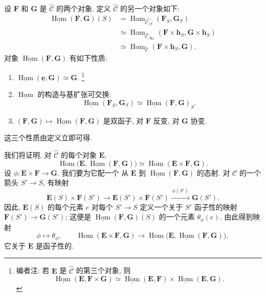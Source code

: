 设 \(\mathbf F\) 和 \(\mathbf G\) 是 \(\widehat{\mathscr C}\)
的两个对象. 定义 \(\widehat{\mathscr C}\) 的另一个对象如下:
\begin{align*}
  \underline{\operatorname{Hom}}(\mathbf F,\mathbf G)(S)
  &={}\operatorname{Hom}_{\widehat{\mathscr C_{/S}}}
       (\mathbf F_S,\mathbf G_S)\\
  &\simeq\operatorname{Hom}_{\widehat{\mathscr C}_{/\mathbf h_S}}
       (\mathbf F\times\mathbf h_S,\mathbf G\times\mathbf h_S)\\
  &\simeq\operatorname{Hom}_{\widehat{\mathscr C}}
       (\mathbf F\times\mathbf h_S,\mathbf G).
\end{align*}
对象 \(\underline{\operatorname{Hom}}(\mathbf F,\mathbf G)\) 有如下性质:
\begin{enumerate}
  \item[(i)]
    \(\underline{\operatorname{Hom}}(\underline{\mathbf e},\mathbf G)
      \simeq\mathbf G\).
    \footnote{编者注: 若 \(\mathbf E\) 是 \(\widehat{\mathscr C}\)
    的第三个对象, 则
    \[
      \underline{\operatorname{Hom}}(\mathbf E,\mathbf F\times\mathbf G)
      \simeq
      \underline{\operatorname{Hom}}(\mathbf E,\mathbf F)
        \times
      \underline{\operatorname{Hom}}(\mathbf E,\mathbf G).
    \]}
  \item[\SGAInlineRefTarget{sga3:i:subsection:1:7:item:ii}(ii)] \(\underline{\operatorname{Hom}}\)
    的构造与基扩张可交换:
    \[
      \underline{\operatorname{Hom}}(\mathbf F_S,\mathbf G_S)
        \simeq
      \underline{\operatorname{Hom}}(\mathbf F,\mathbf G)_S.
    \]
  \item[(iii)]
    \((\mathbf F,\mathbf G)\mapsto
      \underline{\operatorname{Hom}}(\mathbf F,\mathbf G)\) 是双函子,
    对 \(\mathbf F\) 反变, 对 \(\mathbf G\) 协变.
\end{enumerate}
这三个性质由定义立即可得.

我们将证明, 对 \(\widehat{\mathscr C}\) 的每个对象 \(\mathbf E\),
\[
  \operatorname{Hom}
    \bigl(\mathbf E,
      \underline{\operatorname{Hom}}(\mathbf F,\mathbf G)\bigr)
    \simeq
  \operatorname{Hom}(\mathbf E\times\mathbf F,\mathbf G).
\]
设 \(\phi:\mathbf E\times\mathbf F\to\mathbf G\). 我们要为它配一个
从 \(\mathbf E\) 到 \(\underline{\operatorname{Hom}}(\mathbf F,\mathbf G)\)
的态射. 对 \(\mathscr C\) 的一个箭头 \(S'\to S\), 有映射
\[
  \mathbf E(S)\times\mathbf F(S')
    \longrightarrow
  \mathbf E(S')\times\mathbf F(S')
    \xrightarrow{\ \phi(S')\ }
  \mathbf G(S').
\]
因此, \(\mathbf E(S)\) 的每个元素 \(e\) 对每个 \(S'\to S\)
定义一个关于 \(S'\) 函子性的映射 \(\mathbf F(S')\to\mathbf G(S')\);
这便是 \(\underline{\operatorname{Hom}}(\mathbf F,\mathbf G)(S)\)
的一个元素 \(\theta_\phi(e)\). 由此得到映射
\[
  \phi\longmapsto\theta_\phi,
  \qquad
  \operatorname{Hom}(\mathbf E\times\mathbf F,\mathbf G)
    \longrightarrow
  \operatorname{Hom}
    \bigl(\mathbf E,
      \underline{\operatorname{Hom}}(\mathbf F,\mathbf G)\bigr),
\]
它关于 \(\mathbf E\) 是函子性的.

